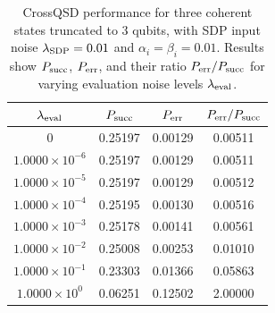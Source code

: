 \begin{table}[ht]
    \centering
    \caption{CrossQSD performance for three coherent states truncated to 3 qubits, with SDP input noise \(\lambda_{\mathrm{SDP}} = 0.01\) and \(\alpha_i = \beta_i = 0.01\). Results show \(P_{\mathrm{succ}}\), \(P_{\mathrm{err}}\), and their ratio \(P_{\mathrm{err}} / P_{\mathrm{succ}}\) for varying evaluation noise levels \(\lambda_{\mathrm{eval}}\).}
    \label{tab:crossqsd_results}
    \begin{tabular}{c c c c}
        \hline
        \textbf{\(\lambda_{\mathrm{eval}}\)}       & \textbf{\(P_{\mathrm{succ}}\)} & \textbf{\(P_{\mathrm{err}}\)} & \textbf{\(P_{\mathrm{err}} / P_{\mathrm{succ}}\)} \\
        \hline
        \(0\)                     & 0.25197             & 0.00129            & 0.00511                     \\
        \(1.0000 \times 10^{-6}\) & 0.25197             & 0.00129            & 0.00511                     \\
        \(1.0000 \times 10^{-5}\) & 0.25197             & 0.00129            & 0.00512                     \\
        \(1.0000 \times 10^{-4}\) & 0.25195             & 0.00130            & 0.00516                     \\
        \(1.0000 \times 10^{-3}\) & 0.25178             & 0.00141            & 0.00561                     \\
        \(1.0000 \times 10^{-2}\) & 0.25008             & 0.00253            & 0.01010                     \\
        \(1.0000 \times 10^{-1}\) & 0.23303             & 0.01366            & 0.05863                     \\
        \(1.0000 \times 10^{0}\)  & 0.06251             & 0.12502            & 2.00000                     \\
        \hline
    \end{tabular}
\end{table}

